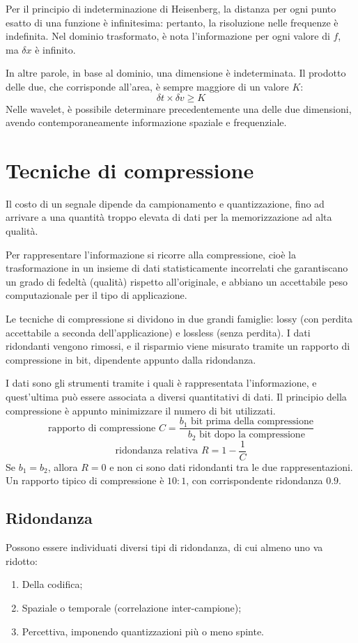 Per il principio di indeterminazione di Heisenberg, la distanza per ogni punto esatto di una funzione è infinitesima: pertanto, la risoluzione nelle frequenze è indefinita. Nel dominio trasformato, è nota l'informazione per ogni valore di $f$, ma $\delta x$ è infinito. 

In altre parole, in base al dominio, una dimensione è indeterminata. Il prodotto delle due, che corrisponde all'area, è sempre maggiore di un valore $K$:
$$\delta t \times \delta v \geq K$$
Nelle wavelet, è possibile determinare precedentemente una delle due dimensioni, avendo contemporaneamente informazione spaziale e frequenziale.

\section{Tecniche di compressione}
Il costo di un segnale dipende da campionamento e quantizzazione, fino ad arrivare a una quantità troppo elevata di dati per la memorizzazione ad alta qualità.

Per rappresentare l'informazione si ricorre alla compressione, cioè la trasformazione in un insieme di dati statisticamente incorrelati che garantiscano un grado di fedeltà (qualità) rispetto all'originale, e abbiano un accettabile peso computazionale per il tipo di applicazione.

Le tecniche di compressione si dividono in due grandi famiglie: lossy (con perdita accettabile a seconda dell'applicazione) e lossless (senza perdita). I dati ridondanti vengono rimossi, e il risparmio viene misurato tramite un rapporto di compressione in bit, dipendente appunto dalla ridondanza. 

I dati sono gli strumenti tramite i quali è rappresentata l'informazione, e quest'ultima può essere associata a diversi quantitativi di dati. Il principio della compressione è appunto minimizzare il numero di bit utilizzati. 
$$\text{rapporto di compressione } C = \frac{b_1 \text{ bit prima della compressione}}{b_2 \text{ bit dopo la compressione}}$$
$$\text{ridondanza relativa } R = 1 - \frac{1}{C}$$
Se $b_1 = b_2$, allora $R = 0$ e non ci sono dati ridondanti tra le due rappresentazioni. Un rapporto tipico di compressione è $10 : 1$, con corrispondente ridondanza $0.9$.

\subsection{Ridondanza}
Possono essere individuati diversi tipi di ridondanza, di cui almeno uno va ridotto:
\begin{enumerate}
	\item Della codifica;
	\item Spaziale o temporale (correlazione inter-campione);
	\item Percettiva, imponendo quantizzazioni più o meno spinte.
\end{enumerate}


